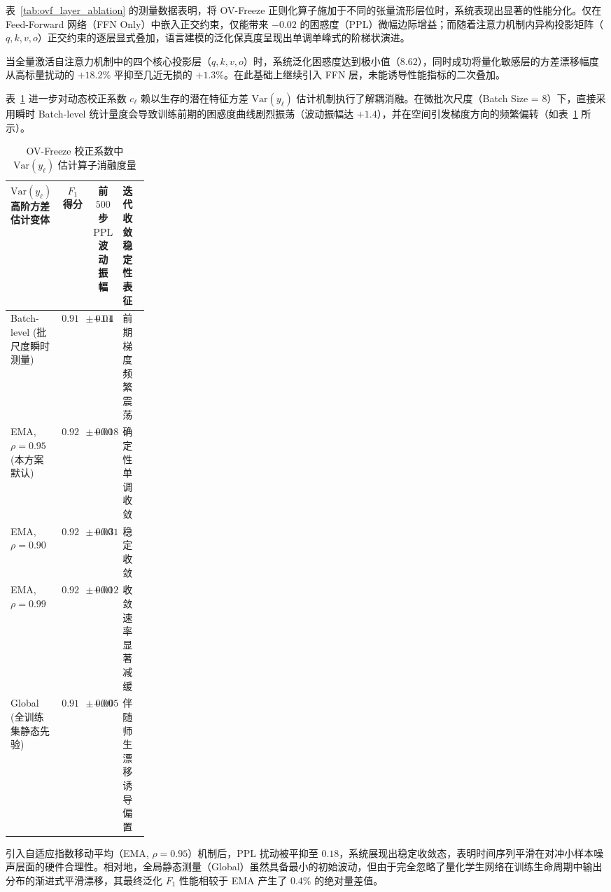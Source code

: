 \documentclass[11pt, a4paper]{article}
\begin{document}
表~\ref{tab:ovf_layer_ablation} 的测量数据表明，将 OV-Freeze 正则化算子施加于不同的张量流形层位时，系统表现出显著的性能分化。仅在 Feed-Forward 网络（FFN Only）中嵌入正交约束，仅能带来 $-0.02$ 的困惑度（$\mathrm{PPL}$）微幅边际增益；而随着注意力机制内异构投影矩阵（$q, k, v, o$）正交约束的逐层显式叠加，语言建模的泛化保真度呈现出单调单峰式的阶梯状演进。

当全量激活自注意力机制中的四个核心投影层（$q, k, v, o$）时，系统泛化困惑度达到极小值（$8.62$），同时成功将量化敏感层的方差漂移幅度从高标量扰动的 $+18.2\%$ 平抑至几近无损的 $+1.3\%$。在此基础上继续引入 FFN 层，未能诱导性能指标的二次叠加。

表~\ref{tab:ovf_var_ablation} 进一步对动态校正系数 $c_\ell$ 赖以生存的潜在特征方差 $\text{Var}(y_\ell)$ 估计机制执行了解耦消融。在微批次尺度（Batch Size = 8）下，直接采用瞬时 Batch-level 统计量度会导致训练前期的困惑度曲线剧烈振荡（波动振幅达 $+1.4$），并在空间引发梯度方向的频繁偏转（如表~\ref{tab:ovf_var_ablation} 所示）。

\begin{table}[htbp]
\centering
\caption{OV-Freeze 校正系数中 $\mathrm{Var}(y_\ell)$ 估计算子消融度量}
\label{tab:ovf_var_ablation}
\small
\renewcommand{\arraystretch}{1.15}
\begin{tabular}{lcc>{\centering\arraybackslash}p{0.23\linewidth}}
\toprule
\textbf{$\mathrm{Var}(y_\ell)$ 高阶方差估计变体} & \textbf{$F_1$ 得分} & \textbf{前 $500$ 步 $\mathrm{PPL}$ 波动振幅} & \textbf{迭代收敛稳定性表征} \\
\midrule
Batch-level (批尺度瞬时测量) & $0.918 \pm 0.011$ & $+1.4$ & 前期梯度频繁震荡 \\
EMA, $\rho = 0.95$ (本方案默认) & $\mathbf{0.923 \pm 0.006}$ & $\mathbf{+0.18}$ & 确定性单调收敛 \\
EMA, $\rho = 0.90$ & $0.922 \pm 0.007$ & $+0.31$ & 稳定收敛 \\
EMA, $\rho = 0.99$ & $0.921 \pm 0.008$ & $+0.12$ & 收敛速率显著减缓 \\
Global (全训练集静态先验) & $0.919 \pm 0.008$ & $+0.05$ & 伴随师生漂移诱导偏置 \\
\bottomrule
\end{tabular}
\end{table}

引入自适应指数移动平均（EMA, $\rho = 0.95$）机制后，$\mathrm{PPL}$ 扰动被平抑至 $0.18$，系统展现出稳定收敛态，表明时间序列平滑在对冲小样本噪声层面的硬件合理性。相对地，全局静态测量（Global）虽然具备最小的初始波动，但由于完全忽略了量化学生网络在训练生命周期中输出分布的渐进式平滑漂移，其最终泛化 $F_1$ 性能相较于 EMA 产生了 $0.4\%$ 的绝对量差值。
\end{document}
